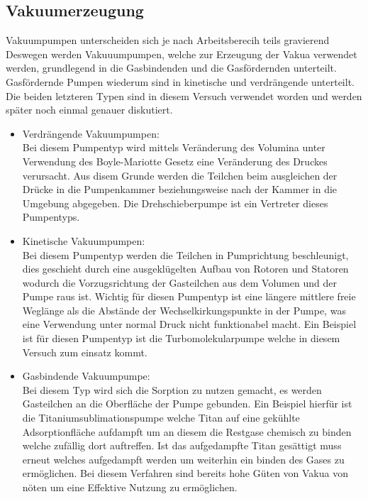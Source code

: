 \subsection{Vakuumerzeugung}
Vakuumpumpen unterscheiden sich je nach Arbeitsberecih teils gravierend 
Deswegen werden Vakuuumpumpen, welche zur Erzeugung der Vakua verwendet werden, grundlegend in die Gasbindenden und die Gasfördernden unterteilt. 
Gasfördernde Pumpen wiederum sind in kinetische und verdrängende unterteilt. Die beiden letzteren Typen sind in diesem Versuch verwendet worden 
und werden später noch einmal genauer diskutiert.
\begin{itemize}
    \item Verdrängende Vakuumpumpen:\\
    Bei diesem Pumpentyp wird mittels Veränderung des Volumina unter Verwendung des Boyle-Mariotte Gesetz eine Veränderung des Druckes 
    verursacht. Aus disem Grunde werden die Teilchen beim ausgleichen der Drücke in die Pumpenkammer beziehungsweise nach der Kammer 
    in die Umgebung abgegeben. Die Drehschieberpumpe ist ein Vertreter dieses Pumpentyps.


    \item Kinetische Vakuumpumpen:\\
    Bei diesem Pumpentyp werden die Teilchen in Pumprichtung beschleunigt, dies geschieht durch eine ausgeklügelten Aufbau von Rotoren 
    und Statoren wodurch die Vorzugsrichtung der Gasteilchen aus dem Volumen und der Pumpe raus ist. Wichtig für diesen Pumpentyp 
    ist eine längere mittlere freie Weglänge als die Abstände der Wechselkirkungspunkte in der Pumpe, was eine Verwendung unter normal 
    Druck nicht funktionabel macht. Ein Beispiel ist für diesen Pumpentyp ist die Turbomolekularpumpe welche in diesem Versuch zum einsatz kommt.

    \item Gasbindende Vakuumpumpe:\\
    Bei diesem Typ wird sich die Sorption zu nutzen gemacht, es werden Gasteilchen an die Oberfläche der Pumpe gebunden. Ein Beispiel 
    hierfür ist die Titaniumsublimationspumpe welche Titan auf eine gekühlte Adsorptionfläche aufdampft um an diesem die Restgase chemisch 
    zu binden welche zufällig dort auftreffen. Ist das aufgedampfte Titan gesättigt muss erneut welches aufgedampft werden um weiterhin ein binden 
    des Gases zu ermöglichen. Bei diesem Verfahren sind bereits hohe Güten von Vakua von nöten um eine Effektive Nutzung zu ermöglichen.
\end{itemize}

